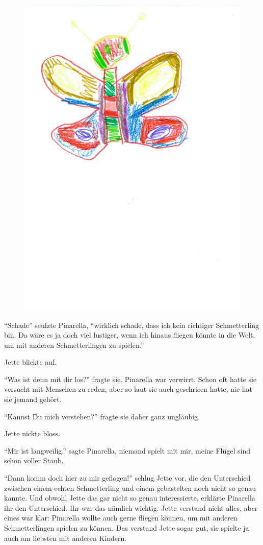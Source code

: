 \begin{figure}[ht]
\centering
\includegraphics[width=.8\textwidth]{bilder/pinarella.pdf}
\end{figure}

\enquote{Schade} seufzte Pinarella, \enquote{wirklich schade, dass ich kein richtiger Schmetterling bin. Da wäre es ja doch viel lustiger, wenn ich hinaus fliegen könnte in die Welt, um mit anderen Schmetterlingen zu spielen.} 

Jette blickte auf.

\enquote{Was ist denn mit dir los?} fragte sie. Pinarella war verwirrt. Schon oft hatte sie versucht mit Menschen zu reden, aber so laut sie auch geschrieen hatte, nie hat sie jemand gehört.

\enquote{Kannst Du mich verstehen?} fragte sie daher ganz ungläubig. 

Jette nickte bloss. 

\enquote{Mir ist langweilig.} sagte Pinarella, niemand spielt mit mir, meine Flügel sind schon voller Staub.

\enquote{Dann komm doch hier zu mir geflogen!} schlug Jette vor, die den Unterschied zwischen einem echten Schmetterling und einem gebastelten noch nicht so genau kannte. Und obwohl Jette das gar nicht so genau interessierte, erklärte Pinarella ihr den Unterschied. Ihr war das nämlich wichtig. Jette verstand nicht alles, aber eines war klar: Pinarella wollte auch gerne fliegen können, um mit anderen Schmetterlingen spielen zu können. Das verstand Jette sogar gut, sie spielte ja auch am liebsten mit anderen Kindern.

